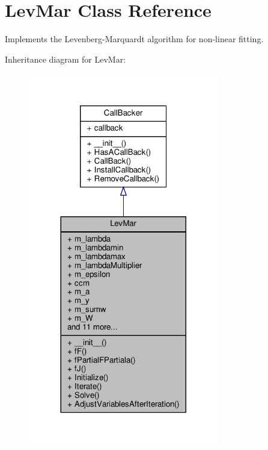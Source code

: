 \hypertarget{classSignalIntegrity_1_1Fit_1_1LevMar_1_1LevMar}{}\section{Lev\+Mar Class Reference}
\label{classSignalIntegrity_1_1Fit_1_1LevMar_1_1LevMar}


Implements the Levenberg-\/\+Marquardt algorithm for non-\/linear fitting.  




Inheritance diagram for Lev\+Mar\+:
\nopagebreak
\begin{figure}[H]
\begin{center}
\leavevmode
\includegraphics[width=236pt]{classSignalIntegrity_1_1Fit_1_1LevMar_1_1LevMar__inherit__graph}
\end{center}
\end{figure}


